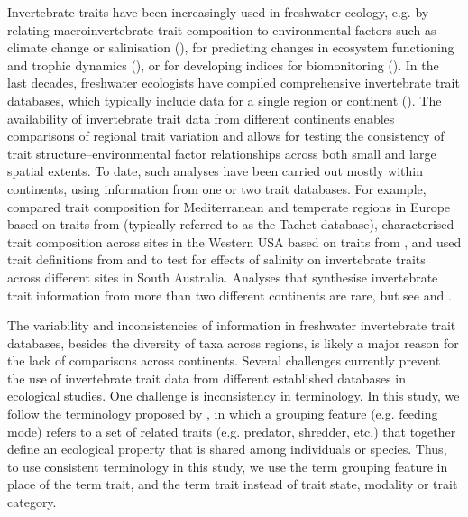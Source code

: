 \documentclass[12pt]{article}
\begin{document}
Invertebrate traits have been increasingly used in freshwater ecology, e.g. by relating macroinvertebrate trait composition to environmental factors such as climate change or salinisation (\cite{bhowmik_large_2015, poff_developing_2010, szocs_effects_2014}), for predicting changes in ecosystem functioning and trophic dynamics (\cite{vos_taxonomic_2017, gutierrez-canovasPopulationsHighvaluePredators2021}), or for developing indices for biomonitoring (\cite{beketov_spear_2009}). In the last decades, freshwater ecologists have compiled comprehensive invertebrate trait databases, which typically include data for a single region or continent (\cite{kefford_integrated_2020, Philips_and_Smith_NZ_DB_2018, schmidt-kloiber_www.freshwaterecology.info_2015, tomanova_trophic_2006, ussegliopolatera_biological_2000, vieira_database_nodate, gayraudInvertebrateTraitsBiomonitoring2003, statznerConservationTaxonomicBiological2007}). The availability of invertebrate trait data from different continents enables comparisons of regional trait variation and allows for testing the consistency of trait structure–environmental factor relationships across both small and large spatial extents. To date, such analyses have been carried out mostly within continents, using information from one or two trait databases. For example, \citet{bonada_taxonomic_2007} compared trait composition for Mediterranean and temperate regions in Europe based on traits from \citet{ussegliopolatera_biological_2000} (typically referred to as the Tachet database), \citet{poff_developing_2010} characterised trait composition across sites in the Western USA based on traits from \citet{poff_functional_2006}, and \citet{botwe_effects_2018} used trait definitions from \citet{poff_functional_2006} and \citet{schafer_trait_2011} to test for effects of salinity on invertebrate traits across different sites in South Australia. Analyses that synthesise invertebrate trait information from more than two different continents are rare, but see \citet{brown_functional_2018} and \citet{statzner_reproductive_1997}. 

The variability and inconsistencies of information in freshwater invertebrate trait databases, besides the diversity of taxa across regions, is likely a major reason for the lack of comparisons across continents. Several challenges currently prevent the use of invertebrate trait data from different established databases in ecological studies. One challenge is inconsistency in terminology. In this study, we follow the terminology proposed by \citet{schmera_proposed_2015}, in which a grouping feature (e.g. feeding mode) refers to a set of related traits (e.g. predator, shredder, etc.) that together define an ecological property that is shared among individuals or species. Thus, to use consistent terminology in this study, we use the term grouping feature in place of the term trait, and the term trait instead of trait state, modality or trait category. 
\end{document}
